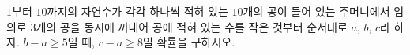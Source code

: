 $1$부터 $10$까지의 자연수가 각각 하나씩 적혀 있는 $10$개의 공이 들어 있는 주머니에서 임의로 $3$개의 공을 동시에 꺼내어 공에 적혀 있는 수를 작은 것부터 순서대로 $a$, $b$, $c$라 하자. $b-a\ge 5$일 때, $c-a\ge 8$일 확률을 구하시오.
